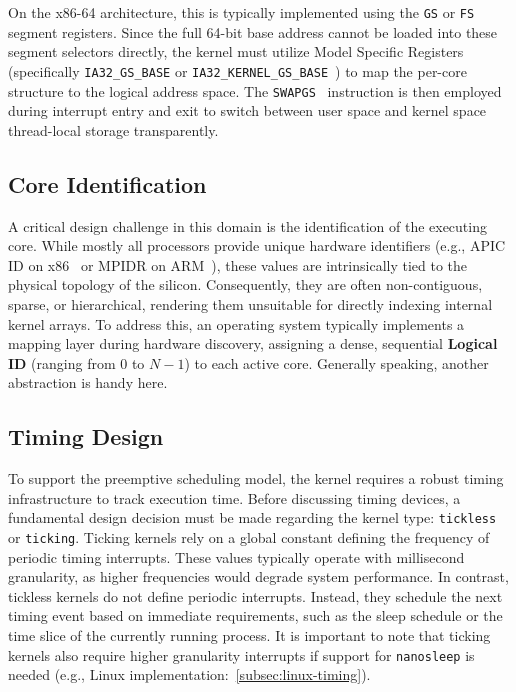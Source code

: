 \documentclass[a4paper,10pt,twoside]{report}
\theoremstyle{definition}
\begin{document}
On the x86-64 architecture, this is typically implemented using the \texttt{GS} or \texttt{FS} segment registers. Since the full 64-bit base address cannot be loaded into these segment selectors directly, the kernel must utilize Model Specific Registers (specifically \texttt{IA32\_GS\_BASE} or \texttt{IA32\_KERNEL\_GS\_BASE}~\cite{Intel-segment-loading}) to map the per-core structure to the logical address space. The \texttt{SWAPGS}~\cite{osdev-gs} instruction is then employed during interrupt entry and exit to switch between user space and kernel space thread-local storage transparently.

\subsection{Core Identification}

A critical design challenge in this domain is the identification of the executing core. While mostly all processors provide unique hardware identifiers (e.g., APIC ID on x86~\cite{Intel-proc-ids} or MPIDR on ARM~\cite{ARM-MPIDR-EL1}), these values are intrinsically tied to the physical topology of the silicon. Consequently, they are often non-contiguous, sparse, or hierarchical, rendering them unsuitable for directly indexing internal kernel arrays. To address this, an operating system typically implements a mapping layer during hardware discovery, assigning a dense, sequential \textbf{Logical ID} (ranging from 0 to $N-1$) to each active core. Generally speaking, another abstraction is handy here.

\subsection{Timing Design}

To support the preemptive scheduling model, the kernel requires a robust timing infrastructure to track execution time. Before discussing timing devices, a fundamental design decision must be made regarding the kernel type: \texttt{tickless} or \texttt{ticking}. Ticking kernels rely on a global constant defining the frequency of periodic timing interrupts. These values typically operate with millisecond granularity, as higher frequencies would degrade system performance. In contrast, tickless kernels do not define periodic interrupts. Instead, they schedule the next timing event based on immediate requirements, such as the sleep schedule or the time slice of the currently running process. It is important to note that ticking kernels also require higher granularity interrupts if support for \texttt{nanosleep} is needed (e.g., Linux implementation:~\ref{subsec:linux-timing}).
\end{document}
